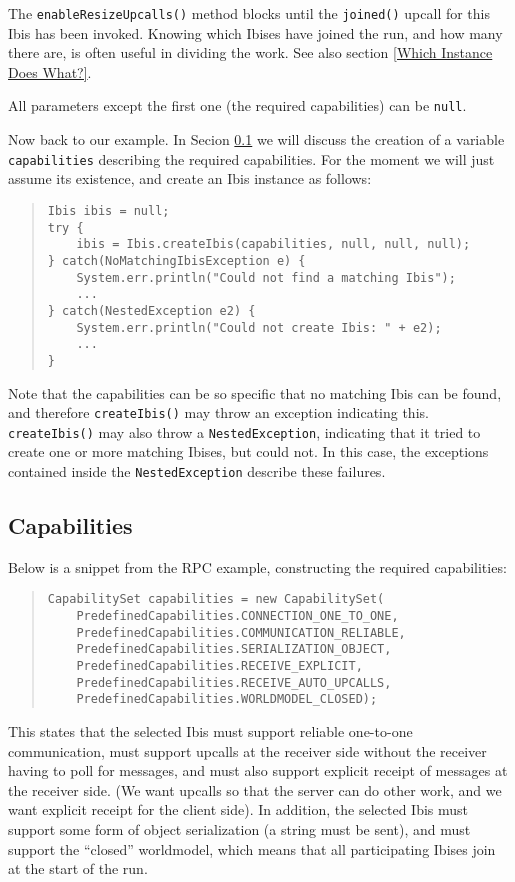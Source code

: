 \documentclass[10pt]{article}
\newcommand{\mysubsection}[1]{\subsection{#1}\label{#1}}
\begin{document}
The \texttt{enableResizeUpcalls()} method blocks until the
\texttt{joined()} upcall for this Ibis has been invoked.  Knowing which Ibises
have joined the run, and how many there are, is often useful in dividing
the work. See also section \ref{Which Instance Does What?}.

All parameters except the first one (the required capabilities) can be
\texttt{null}.

Now back to our example. In Secion \ref{Capabilities} we will
discuss the creation of a variable \texttt{capabilities} describing the
required capabilities. For the moment we will just assume its
existence, and create an Ibis instance as follows:
{\small
\begin{quote}
\begin{verbatim}
Ibis ibis = null;
try {
    ibis = Ibis.createIbis(capabilities, null, null, null);
} catch(NoMatchingIbisException e) {
    System.err.println("Could not find a matching Ibis");
    ...
} catch(NestedException e2) {
    System.err.println("Could not create Ibis: " + e2);
    ...
}
\end{verbatim}
\end{quote}
}
Note that the capabilities can be so specific that no matching Ibis
can be found, and therefore \texttt{createIbis()} may throw an exception
indicating this.
\texttt{createIbis()} may also throw a \texttt{NestedException}, indicating
that it tried to create one or more matching Ibises, but could not.
In this case, the exceptions contained inside the \texttt{NestedException}
describe these failures.

\mysubsection{Capabilities}

Below is a snippet from the RPC example, constructing the required capabilities:
{\small
\begin{quote}
\begin{verbatim}
CapabilitySet capabilities = new CapabilitySet(
    PredefinedCapabilities.CONNECTION_ONE_TO_ONE,
    PredefinedCapabilities.COMMUNICATION_RELIABLE,
    PredefinedCapabilities.SERIALIZATION_OBJECT,
    PredefinedCapabilities.RECEIVE_EXPLICIT,
    PredefinedCapabilities.RECEIVE_AUTO_UPCALLS,
    PredefinedCapabilities.WORLDMODEL_CLOSED);
\end{verbatim}
\end{quote}
}
This states that the selected Ibis must support reliable one-to-one
communication, must support upcalls at the receiver side without the
receiver having to poll for messages, and must also support explicit
receipt of messages at the receiver side.
(We want upcalls so that the server can do other work, and we want
explicit receipt for the client side).
In addition, the selected Ibis must support some form of object
serialization (a string must be sent),
and must support the ``closed'' worldmodel, which means
that all participating Ibises join at the start of the run.
\end{document}
